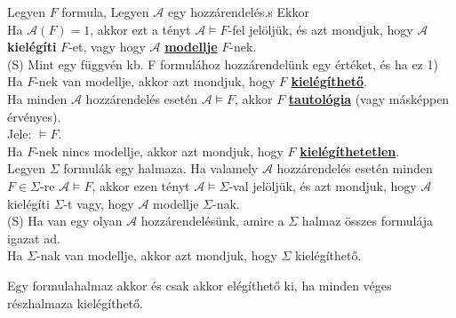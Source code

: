 \begin{frame}

\begin{tcolorbox}[squeezed title={Formula modellje, Kielégíthető, Tautológia, Kielégíthetetlen}]
Legyen $F$ formula, Legyen $\mathcal{A}$ egy hozzárendelés.s Ekkor\\
\mbigskip
Ha $\mathcal{A}(F) = 1$, akkor ezt a tényt $\mathcal{A} \models F$-fel jelöljük, és azt mondjuk, hogy $\mathcal{A}$ \textbf{kielégíti} $F$-et, vagy hogy $\mathcal{A}$ \underline{\textbf{modellje}} $F$-nek.\\
{\tiny (S) Mint egy függvén kb. F formulához hozzárendelünk egy értéket, és ha ez 1)}\\
\mbigskip
Ha $F$-nek van modellje, akkor azt mondjuk, hogy $F$ \underline{\textbf{kielégíthető}}.\\
\mbigskip
Ha minden $\mathcal{A}$ hozzárendelés esetén $\mathcal{A} \models F$, akkor $F$ \underline{\textbf{tautológia}} (vagy másképpen érvényes).\\
Jele: $\models F$.\\
\mbigskip
Ha $F$-nek nincs modellje, akkor azt mondjuk, hogy $F$ \underline{\textbf{kielégíthetetlen}}.\\
\mbigskip
Legyen $\Sigma$ formulák egy halmaza. Ha valamely $\mathcal{A}$ hozzárendelés esetén minden $F \in \Sigma$-re $\mathcal{A} \models F$, akkor ezen tényt $\mathcal{A} \models \Sigma$-val jelöljük, és azt mondjuk, hogy $\mathcal{A}$ kielégíti $\Sigma$-t vagy, hogy $\mathcal{A}$ modellje $\Sigma$-nak.\\
{\tiny (S) Ha van egy olyan $\mathcal{A}$ hozzárendelésünk, amire a $\Sigma$ halmaz összes formulája igazat ad.}\\
\mbigskip
Ha $\Sigma$-nak van modellje, akkor azt mondjuk, hogy $\Sigma$ kielégíthető.
\end{tcolorbox}
\end{frame}

\begin{frame}
\begin{tcolorbox}[title={Tétel: Az ítéletkalkulus kompaktsági tétele}]
Egy formulahalmaz akkor és csak akkor elégíthető ki, ha minden véges részhalmaza kielégíthető.
\end{tcolorbox}
\end{frame}

